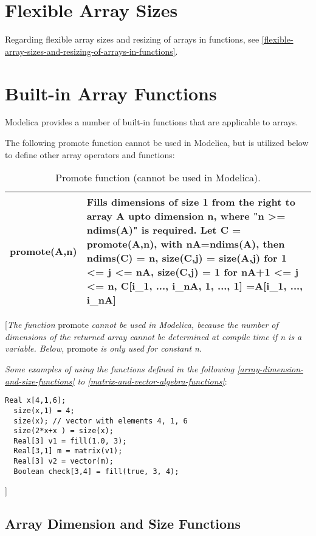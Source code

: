 \section{Flexible Array Sizes}

Regarding flexible array sizes and resizing of arrays in functions, see
\autoref{flexible-array-sizes-and-resizing-of-arrays-in-functions}.

\section{Built-in Array Functions}

Modelica provides a number of built-in functions that are applicable to
arrays.

The following promote function cannot be used in Modelica, but is
utilized below to define other array operators and functions:

\begin{longtable}[]{|l|p{9cm}|}
\caption{Promote function (cannot be used in Modelica).}\\
\hline \endhead
promote(A,n) & Fills dimensions of size 1 from the right to array A upto
dimension n, where "n \textgreater{}= ndims(A)" is required. Let C =
promote(A,n), with nA=ndims(A), then ndims(C) = n, size(C,j) = size(A,j)
for 1 \textless{}= j \textless{}= nA, size(C,j) = 1 for nA+1 <= j <= n, C{[}i\_1, ..., i\_nA, 1, ..., 1{]} =A{[}i\_1, ..., i\_nA{]}\\ \hline
\end{longtable}

{[}\emph{The function} promote \emph{cannot be used in Modelica, because
the number of dimensions of the returned array cannot be determined at
compile time if n is a variable. Below,} promote \emph{is only used for
constant n}.

\emph{Some examples of using the functions defined in the following
\autoref{array-dimension-and-size-functions} to \autoref{matrix-and-vector-algebra-functions}}:

\begin{lstlisting}[language=modelica]
  Real x[4,1,6];
  size(x,1) = 4;
  size(x); // vector with elements 4, 1, 6
  size(2*x+x ) = size(x);
  Real[3] v1 = fill(1.0, 3);
  Real[3,1] m = matrix(v1);
  Real[3] v2 = vector(m);
  Boolean check[3,4] = fill(true, 3, 4);
\end{lstlisting}
{]}

\subsection{Array Dimension and Size Functions}

